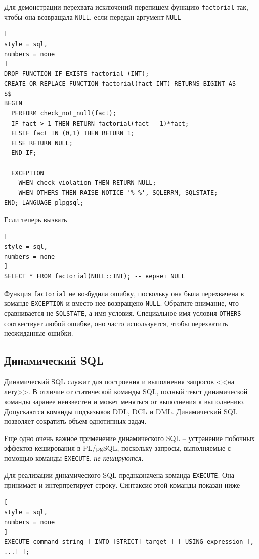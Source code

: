 \documentclass[%
	11pt,
	a4paper,
	utf8,
		]{article}
\begin{document}
Для демонстрации перехвата исключений перепишем функцию \texttt{factorial} так, чтобы она возвращала \texttt{NULL}, если передан аргумент \texttt{NULL}
\begin{lstlisting}[
style = sql,
numbers = none
]
DROP FUNCTION IF EXISTS factorial (INT);
CREATE OR REPLACE FUNCTION factorial(fact INT) RETURNS BIGINT AS
$$
BEGIN
  PERFORM check_not_null(fact);
  IF fact > 1 THEN RETURN factorial(fact - 1)*fact;
  ELSIF fact IN (0,1) THEN RETURN 1;
  ELSE RETURN NULL;
  END IF;
  
  EXCEPTION
    WHEN check_violation THEN RETURN NULL;
    WHEN OTHERS THEN RAISE NOTICE '% %', SQLERRM, SQLSTATE;
END; LANGUAGE plpgsql;
\end{lstlisting}

Если теперь вызвать
\begin{lstlisting}[
style = sql,
numbers = none
]
SELECT * FROM factorial(NULL::INT); -- вернет NULL
\end{lstlisting}

Функция \texttt{factorial} не возбудила ошибку, поскольку она была перехвачена в команде \texttt{EXCEPTION} и вместо нее возвращено \texttt{NULL}. Обратите внимание, что сравнивается не \texttt{SQLSTATE}, а имя условия. Специальное имя условия \texttt{OTHERS} соотвествует любой ошибке, оно часто используется, чтобы перехватить неожиданные ошибки.

\subsection{Динамический SQL}

Динамический SQL служит для построения и выполнения запросов <<на лету>>. В отличие от статической команды SQL, полный текст динамической команды заранее неизвестен и может меняться от выполнения к выполнению. Допускаются команды подъязыков DDL, DCL и DML. Динамический SQL позволяет сократить объем однотипных задач.

Еще одно очень важное применение динамического SQL -- устранение побочных эффектов кеширования в PL/pgSQL, поскольку запросы, выполняемые с помощью команды \texttt{EXECUTE}, \emph{не кешируются}.

Для реализации динамического SQL предназначена команда \texttt{EXECUTE}. Она принимает и интерпретирует строку. Синтаксис этой команды показан ниже
\begin{lstlisting}[
style = sql,
numbers = none
]
EXECUTE command-string [ INTO [STRICT] target ] [ USING expression [, ...] ];
\end{lstlisting}
\end{document}
